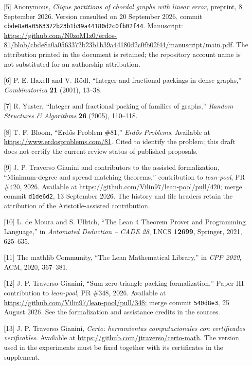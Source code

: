 \documentclass[english,11pt,a4paper]{article}
\begin{document}
{[}5{]} Anonymous, \emph{Clique partitions of chordal graphs with linear error}, preprint, 8 September 2026. Version consulted on 20 September 2026, commit \nolinkurl{cbde8a0a0563372b23b1b39a44180d2c0fb02f44}. Manuscript: \url{https://github.com/N0zoM1z0/erdos-81/blob/cbde8a0a0563372b23b1b39a44180d2c0fb02f44/manuscript/main.pdf}. The attribution printed in the document is retained; the repository account name is not substituted for an authorship attribution.

{[}6{]} P. E. Haxell and V. Rödl, ``Integer and fractional packings in dense graphs,'' \emph{Combinatorica} \textbf{21} (2001), 13--38.

{[}7{]} R. Yuster, ``Integer and fractional packing of families of graphs,'' \emph{Random Structures \& Algorithms} \textbf{26} (2005), 110--118.

{[}8{]} T. F. Bloom, ``Erdős Problem \#81,'' \emph{Erdős Problems}. Available at \url{https://www.erdosproblems.com/81}. Cited to identify the problem; this draft does not certify the current review status of published proposals.

{[}9{]} J. P. Traverso Gianini and contributors to the assisted formalization, ``Minimum-degree and spread matching theorems,'' contribution to \emph{lean-pool}, PR \#420, 2026. Available at \url{https://github.com/Vilin97/lean-pool/pull/420}; merge commit \nolinkurl{d1de6d2}, 13 September 2026. The history and file headers retain the attribution of the Aristotle-assisted contribution.

\clearpage
{[}10{]} L. de Moura and S. Ullrich, ``The Lean 4 Theorem Prover and Programming Language,'' in \emph{Automated Deduction -- CADE 28}, LNCS \textbf{12699}, Springer, 2021, 625--635.

{[}11{]} The mathlib Community, ``The Lean Mathematical Library,'' in \emph{CPP 2020}, ACM, 2020, 367--381.

{[}12{]} J. P. Traverso Gianini, ``Sum-zero triangle packing formalization,'' Paper III contribution to \emph{lean-pool}, PR \#348, 2026. Available at \url{https://github.com/Vilin97/lean-pool/pull/348}; merge commit \nolinkurl{540d8e3}, 25 August 2026. See the formalization and assistance credits in the sources.

{[}13{]} J. P. Traverso Gianini, \emph{Certo: herramientas computacionales con certificados verificables}. Available at \url{https://github.com/jtraverso/certo-math}. The version used in the experiments must be fixed together with its certificates in the supplement.
\end{document}
